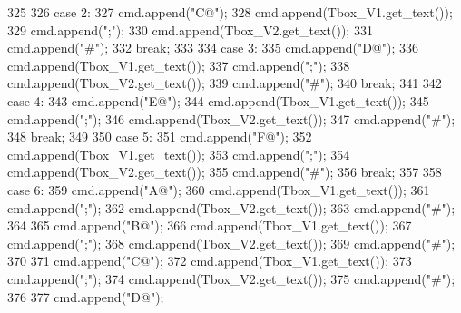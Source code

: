 \begin{DoxyCode}
325 \textcolor{comment}{}
326 \textcolor{comment}{        case 2:}
327 \textcolor{comment}{        cmd.append("C@");}
328 \textcolor{comment}{        cmd.append(Tbox\_V1.get\_text());}
329 \textcolor{comment}{        cmd.append(";");}
330 \textcolor{comment}{        cmd.append(Tbox\_V2.get\_text());}
331 \textcolor{comment}{        cmd.append("#");}
332 \textcolor{comment}{        break;}
333 \textcolor{comment}{}
334 \textcolor{comment}{        case 3:}
335 \textcolor{comment}{        cmd.append("D@");}
336 \textcolor{comment}{        cmd.append(Tbox\_V1.get\_text());}
337 \textcolor{comment}{        cmd.append(";");}
338 \textcolor{comment}{        cmd.append(Tbox\_V2.get\_text());}
339 \textcolor{comment}{        cmd.append("#");}
340 \textcolor{comment}{        break;}
341 \textcolor{comment}{}
342 \textcolor{comment}{        case 4:}
343 \textcolor{comment}{        cmd.append("E@");}
344 \textcolor{comment}{        cmd.append(Tbox\_V1.get\_text());}
345 \textcolor{comment}{        cmd.append(";");}
346 \textcolor{comment}{        cmd.append(Tbox\_V2.get\_text());}
347 \textcolor{comment}{        cmd.append("#");}
348 \textcolor{comment}{        break;}
349 \textcolor{comment}{}
350 \textcolor{comment}{        case 5:}
351 \textcolor{comment}{        cmd.append("F@");}
352 \textcolor{comment}{        cmd.append(Tbox\_V1.get\_text());}
353 \textcolor{comment}{        cmd.append(";");}
354 \textcolor{comment}{        cmd.append(Tbox\_V2.get\_text());}
355 \textcolor{comment}{        cmd.append("#");}
356 \textcolor{comment}{        break;}
357 \textcolor{comment}{}
358 \textcolor{comment}{        case 6:}
359 \textcolor{comment}{        cmd.append("A@");}
360 \textcolor{comment}{        cmd.append(Tbox\_V1.get\_text());}
361 \textcolor{comment}{        cmd.append(";");}
362 \textcolor{comment}{        cmd.append(Tbox\_V2.get\_text());}
363 \textcolor{comment}{        cmd.append("#");}
364 \textcolor{comment}{}
365 \textcolor{comment}{        cmd.append("B@");}
366 \textcolor{comment}{        cmd.append(Tbox\_V1.get\_text());}
367 \textcolor{comment}{        cmd.append(";");}
368 \textcolor{comment}{        cmd.append(Tbox\_V2.get\_text());}
369 \textcolor{comment}{        cmd.append("#");}
370 \textcolor{comment}{}
371 \textcolor{comment}{        cmd.append("C@");}
372 \textcolor{comment}{        cmd.append(Tbox\_V1.get\_text());}
373 \textcolor{comment}{        cmd.append(";");}
374 \textcolor{comment}{        cmd.append(Tbox\_V2.get\_text());}
375 \textcolor{comment}{        cmd.append("#");}
376 \textcolor{comment}{}
377 \textcolor{comment}{        cmd.append("D@");}

\end{DoxyCode}

